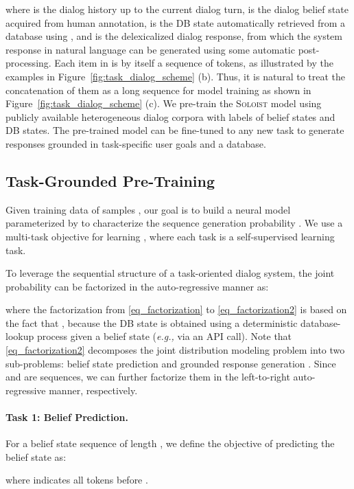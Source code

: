 \documentclass[11pt,a4paper]{article}
\newcommand{\eg}[0]{\emph{e.g., }}
\newcommand{\model}{\textsc{Soloist}}
\begin{document}
where  is the dialog history up to the current dialog turn,  is the dialog belief state acquired from human annotation,  is the DB state automatically retrieved from a database using , and  is the delexicalized dialog response, from which the system response in natural language can be generated using some automatic post-processing. 
Each item in  is by itself a sequence of tokens, as illustrated by the examples in Figure~\ref{fig:task_dialog_scheme} (b).
Thus, it is natural to treat the concatenation of them as a long sequence for model training as shown in Figure~\ref{fig:task_dialog_scheme} (c). 
We pre-train the \model{} model using publicly available heterogeneous dialog corpora with labels of belief states and DB states.
The pre-trained model can be fine-tuned to any new task to generate responses grounded in task-specific user goals and a database.

\subsection{Task-Grounded Pre-Training}
\label{sec:method}

Given training data of  samples , 
our goal is to build a neural model parameterized by  to characterize the sequence generation probability . We use a multi-task objective for learning , where each task is a self-supervised learning task. 

To leverage the sequential structure of a task-oriented dialog system, the joint probability  can be factorized in the auto-regressive manner as:

where the factorization from \eqref{eq_factorization} to \eqref{eq_factorization2} is based on the fact that , because the DB state  is obtained using a deterministic database-lookup process given a belief state  (\eg via an API call).    
Note that \eqref{eq_factorization2} decomposes the joint distribution modeling problem into two sub-problems: belief state prediction  and grounded response generation . Since  and  are sequences, we can further factorize them in the left-to-right auto-regressive manner, respectively.  

\paragraph{Task 1: Belief Prediction.}
For a belief state sequence of length , we define the objective of predicting the belief state as: 

where  indicates all tokens before .
\end{document}
